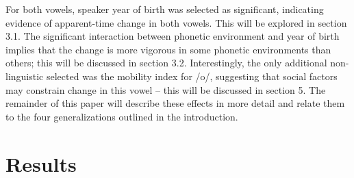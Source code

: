 \documentclass[12pt]{article}
\begin{document}
For both vowels, speaker year of birth was selected as significant, indicating evidence of apparent-time change in both vowels. This will be explored in section 3.1. The significant interaction between phonetic environment and year of birth implies that the change is more vigorous in some phonetic environments than others; this will be discussed in section 3.2. Interestingly, the only additional non-linguistic selected was the mobility index for /o/, suggesting that social factors may constrain change in this vowel -- this will be discussed in section 5. The remainder of this paper will describe these effects in more detail and relate them to the four generalizations outlined in the introduction.

\section{Results}
\end{document}
